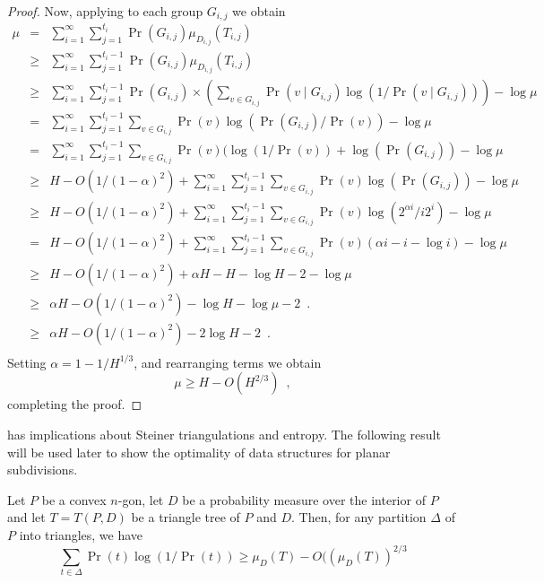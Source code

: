 \documentclass[charterfonts,lotsofwhite]{patmorin}
\newcommand{\blah}{O(1/(1-\alpha)^2)}
\begin{document}
\begin{proof}
Now, applying  to each group $G_{i,j}$ 
we obtain
\begin{eqnarray*}
\mu & = & \sum_{i=1}^{\infty}\sum_{j=1}^{t_i}
	\Pr(G_{i,j})\mu_{D_{i,j}}(T_{i,j}) \\
& \ge & \sum_{i=1}^{\infty}\sum_{j=1}^{t_i-1}
	\Pr(G_{i,j})\mu_{D_{i,j}}(T_{i,j}) \\
& \ge & \sum_{i=1}^{\infty}\sum_{j=1}^{t_i-1}\Pr(G_{i,j})\times
	\left(
	\sum_{v\in G_{i,j}}\Pr(v\mid G_{i,j})\log(1/\Pr(v\mid G_{i,j}))
	\right) 
        - \log\mu \\
& = & \sum_{i=1}^{\infty}\sum_{j=1}^{t_i-1}
	\sum_{v\in G_{i,j}}\Pr(v)\log(\Pr(G_{i,j})/\Pr(v)) 
        - \log\mu \\
& = & \sum_{i=1}^{\infty}\sum_{j=1}^{t_i-1}
	\sum_{v\in G_{i,j}}\Pr(v)(\log(1/\Pr(v))+ \log(\Pr(G_{i,j})) 
        - \log\mu \\
& \ge & H-\blah +
        \sum_{i=1}^{\infty}\sum_{j=1}^{t_i-1}
	\sum_{v\in G_{i,j}}\Pr(v)\log(\Pr(G_{i,j})) 
        - \log\mu \\
& \ge & H-\blah +
        \sum_{i=1}^{\infty}\sum_{j=1}^{t_i-1}
	\sum_{v\in G_{i,j}}\Pr(v)\log(2^{\alpha i}/i2^{i}) 
        - \log\mu \\
& = & H-\blah 
        +\sum_{i=1}^{\infty}\sum_{j=1}^{t_i-1}
	\sum_{v\in G_{i,j}}\Pr(v)(\alpha i -i -\log i) 
        - \log\mu \\
& \ge & H-\blah + \alpha H - H - \log H - 2 - \log\mu \\
& \ge & \alpha H-\blah - \log H - \log \mu - 2 \enspace . \\
& \ge & \alpha H-\blah - 2\log H - 2 \enspace . \\
\end{eqnarray*}
Setting $\alpha=1-1/H^{1/3}$, and rearranging terms
we obtain
\[
    \mu \ge H - O(H^{2/3}) \enspace ,
\]
completing the proof.
\end{proof}

 has implications about Steiner triangulations and
entropy.  The following result will be used later to show the
optimality of data structures for planar subdivisions.

\begin{lem}
Let $P$ be a convex $n$-gon, let $D$ be a probability measure over
the interior of $P$ and let $T=T(P,D)$ be a triangle tree of $P$ and
$D$.  Then, for any partition $\Delta$ of $P$ into
triangles, we have
\[
  \sum_{t\in \Delta} \Pr(t)\log(1/\Pr(t)) \ge \mu_D(T) - O((\mu_D(T))^{2/3}
\]
\end{lem}
\end{document}
